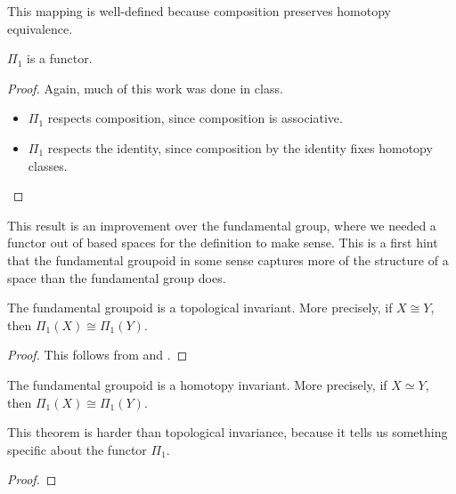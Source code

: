 
This mapping is well-defined because composition preserves homotopy equivalence.


\begin{prop}\label{fundamental groupoid is a functor}
	$\Pi_1$ is a functor.
\end{prop}

\begin{proof}
	Again, much of this work was done in class.
	\begin{itemize}
		\item $\Pi_1$ respects composition, since composition is associative.
		\item $\Pi_1$ respects the identity, since composition by the identity
		      fixes homotopy classes. \qedhere
	\end{itemize}
\end{proof}

This result is an improvement over the fundamental group, where we needed a
functor out of based spaces for the definition to make sense. This is a first
hint that the fundamental groupoid in some sense captures more of the structure
of a space than the fundamental group does.

\begin{cor}\label{fundamental groupoid is topological}
	The fundamental groupoid is a topological invariant. More precisely, if
	$X\cong Y$, then $\Pi_1(X)\cong \Pi_1(Y)$.
\end{cor}

\begin{proof}
	This follows from  and .
\end{proof}

\begin{thm}\label{fundamental groupoid is homotopy invariant}
	The fundamental groupoid is a homotopy invariant. More precisely, if $X\simeq
		Y$, then $\Pi_1(X)\cong \Pi_1(Y)$.
\end{thm}

This theorem is harder than topological invariance, because it tells us
something specific about the functor $\Pi_1$.


\begin{proof}

\end{proof}
